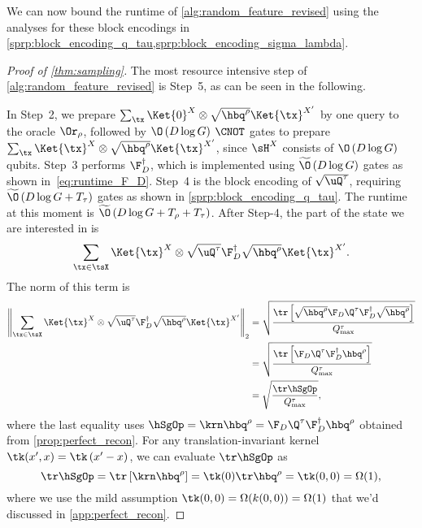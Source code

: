 We can now bound the runtime of \cref{alg:random_feature_revised} using the analyses for these block encodings in \cref{sprp:block_encoding_q_tau,sprp:block_encoding_sigma_lambda}.

\begin{proof}[Proof of \cref{thm:sampling}]
  The most resource intensive step of \cref{alg:random_feature_revised} is Step~5, as can be seen in the following.

  In Step~2, we prepare $\sum_{\tx}\Ket{0}^X\otimes\sqrt{\hbq^{\rho}}\Ket{\tx}^{X'}$ by one query to the oracle $\Or_\rho$, followed by $\O\left(D\log G \right)$ $\CNOT$ gates to prepare $\sum_{\tx}\Ket{\tx}^X\otimes\sqrt{\hbq^{\rho}}\Ket{\tx}^{X'}$, since $\sH^X$ consists of $\O\left(D\log G \right)$ qubits.
Step~3 performs $\F_{D}^\dag$, which is implemented using $\widetilde{\O}\left(D\log G\right)$ gates as shown in~\cref{eq:runtime_F_D}.
Step~4 is the block encoding of $\sqrt{\uQ^{\tau}}$, requiring $\widetilde{\O}\left(D\log G +T_\tau\right)$ gates as shown in \cref{sprp:block_encoding_q_tau}.
The runtime at this moment is $\widetilde{\O}\left(D\log G+T_\rho+T_\tau\right)$.
After Step-4, the part of the state we are interested in is
\begin{equation}
  \label{eq:state_to_amplify}
  \sum_{\tx\in\tsX}\Ket{\tx}^X\otimes \sqrt{\uQ^{\tau}}\F_{D}^\dag\sqrt{\hbq^{\rho}}\Ket{\tx}^{X'}.
\end{equation}
The norm of this term is
\begin{align}
  \left\|\sum_{\tx\in\tsX}\Ket{\tx}^X\otimes \sqrt{\uQ^{\tau}}\F_{D}^\dag\sqrt{\hbq^{\rho}}\Ket{\tx}^{X'}\right\|_2 &=\sqrt{\frac{\tr\left[\sqrt{\hbq^{\rho}} \F_{D} \Q^{\tau}\F_{D}^\dag\sqrt{\hbq^{\rho}}\right]}{Q_{\max}^{\tau}}}\nonumber\\
  &=\sqrt{\frac{\tr\left[\F_{D} \Q^{\tau}\F_{D}^\dag\hbq^{\rho}\right]}{Q_{\max}^{\tau}}}\nonumber\\
  &=\sqrt{\frac{\tr\hSgOp}{Q_{\max}^{\tau}}},
\end{align}
where the last equality uses $\hSgOp=\krn\hbq^{\rho}=\F_D \Q^{\tau} \F_D^\dag \hbq^{\rho}$ obtained from \cref{prop:perfect_recon}.
For any translation-invariant kernel $\tk(x',x)=\tk\left(x'-x\right)$, we can evaluate $\tr\hSgOp$ as
\begin{equation}
  \tr\hSgOp=\tr \left[\krn \hbq^{\rho}\right]=\tk(0)\tr \hbq^{\rho}=\tk(0,0)=\Omega(1),
\end{equation}
where we use the mild assumption $\tk(0,0)=\Omega(k(0,0))=\Omega(1)$ that we'd discussed in \cref{app:perfect_recon}.

\end{proof}
